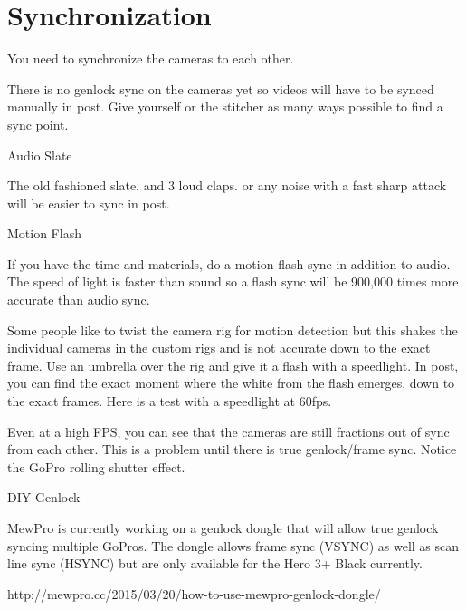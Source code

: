 \chapter{Synchronization}
\pagecolor{white}
\label{chap:22}
\begin{fullwidth}


\problem

{\large You need to synchronize the cameras to each other. \par}

There is no genlock sync on the cameras yet so videos will have to be synced manually in post. Give yourself or the stitcher as many ways possible to find a sync point. 

\solution

{\large Audio Slate \par}

The old fashioned slate. and 3 loud claps. or any noise with a fast sharp attack will be easier to sync in post. 

{\large Motion Flash \par}

If you have the time and materials, do a motion flash sync in addition to audio. The speed of light is faster than sound so a flash sync will be 900,000 times more accurate than audio sync. 

Some people like to twist the camera rig for motion detection but this shakes the individual cameras in the custom rigs and is not accurate down to the exact frame. 
Use an umbrella over the rig and give it a flash with a speedlight. In post, you can find the exact moment where the white from the flash emerges, down to the exact frames. 
\clearpage
Here is a test with a speedlight at 60fps. 


Even at a high FPS, you can see that the cameras are still fractions out of sync from each other. This is a problem until there is true genlock/frame sync. Notice the GoPro rolling shutter effect. 

{\large DIY Genlock \par}

MewPro is currently working on a genlock dongle that will allow true genlock syncing multiple GoPros. The dongle allows frame sync (VSYNC) as well as scan line sync (HSYNC) but are only available for the Hero 3+ Black currently. 

http://mewpro.cc/2015/03/20/how-to-use-mewpro-genlock-dongle/


\clearpage
\end{fullwidth}
